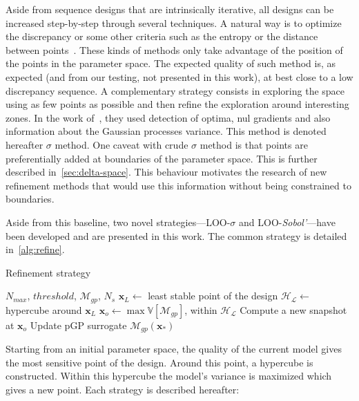 Aside from sequence designs that are intrinsically iterative, all designs can be increased step-by-step through several techniques. A natural way is to optimize the discrepancy or some other criteria such as the entropy or the distance between points~\cite{Fang2006}. These kinds of methods only take advantage of the position of the points in the parameter space. The expected quality of such method is, as expected (and from our testing, not presented in this work), at best close to a low discrepancy sequence. A complementary strategy consists in exploring the space using as few points as possible and then refine the exploration around interesting zones. In the work of~\cite{scheidt2006,braconnier2011}, they used detection of optima, nul gradients and also information about the Gaussian processes variance. This method is denoted hereafter $\sigma$ method. One caveat with crude $\sigma$ method is that points are preferentially added at boundaries of the parameter space. This is further described in~\cref{sec:delta-space}. This behaviour motivates the research of new refinement methods that would use this information without being constrained to boundaries.

Aside from this baseline, two novel strategies---LOO-$\sigma$ and LOO-\textit{Sobol'}---have been developed and are presented in this work. The common strategy is detailed in~\cref{alg:refine}.

\begin{algorithm}
  \caption{Refinement strategy}
  \label{alg:refine}
  \begin{algorithmic}[1]
  \Require $N_{max}$, $threshold$, $\mathcal{M}_{gp}$, $N_s$
    \State $\mathbf{x}_{L} \gets$ least stable point of the design
    \State $\mathcal{H_{L}} \gets$ hypercube around $\mathbf{x}_{L}$
    \State $\mathbf{x}_o \gets \max \mathbb{V}[\mathcal{M}_{gp}]$, within $\mathcal{H_{L}}$
    \State Compute a new snapshot at $\mathbf{x}_o$
    \State Update pGP surrogate $\mathcal{M}_{gp}(\mathbf{x}_*)$
  \EndWhile
  \end{algorithmic}
\end{algorithm}

Starting from an initial parameter space, the quality of the current model gives the most sensitive point of the design. Around this point, a hypercube is constructed. Within this hypercube the model's variance is maximized which gives a new point. Each strategy is described hereafter:

